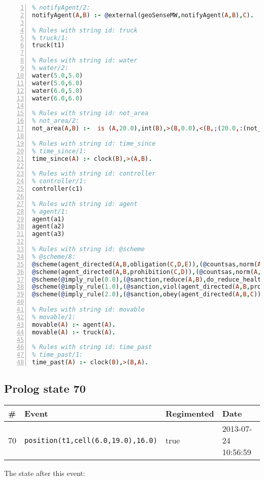 \documentclass[11pt]{article}\usepackage[utf8]{inputenc}\usepackage{geometry}
\begin{document}
\begin{lstlisting}[language=Prolog, numbers=left]
% Rules with string id: notifyAgent
% notifyAgent/2:
notifyAgent(A,B) :- @external(geoSenseMW,notifyAgent(A,B),C).

% Rules with string id: truck
% truck/1:
truck(t1)

% Rules with string id: water
% water/2:
water(5.0,5.0)
water(5.0,6.0)
water(6.0,5.0)
water(6.0,6.0)

% Rules with string id: not_area
% not_area/2:
not_area(A,B) :-  is (A,20.0),int(B),>(B,0.0),<(B,;(20.0,:(not_area(A,B), is (-(B),20.0)))),int(A),>(A,0.0),<(A,;(20.0,:(area(A,B),-(int(A))))),int(B),>(A,0.0),>(B,0.0),<(A,21.0),<(B,21.0).

% Rules with string id: time_since
% time_since/1:
time_since(A) :- clock(B),>(A,B).

% Rules with string id: controller
% controller/1:
controller(c1)

% Rules with string id: agent
% agent/1:
agent(a1)
agent(a2)
agent(a3)

% Rules with string id: @scheme
% @scheme/8:
@scheme(agent_directed(A,B,obligation(C,D,E)),(@countsas,norm(A,B,F,obligation(C,D,E)),F),false,(listTrue(C)),(time_past(D)),false,[plus(viol(agent_directed(A,B,obligation(C,D,E))))|[]],[plus(obey(agent_directed(A,B,obligation(C,D,E))))|[]])
@scheme(agent_directed(A,B,prohibition(C,D)),(@countsas,norm(A,B,E,prohibition(C,D)),E),(listTrue(C)),false,(false),false,[plus(viol(agent_directed(A,B,prohibition(C,D))))|[]],[plus(obey(agent_directed(A,B,prohibition(C,D))))|[]])
@scheme(@imply_rule(0.0),(@sanction,reduce(A,B),do_reduce_health(A,B),notifyAgent(A,changed(status))),true,false,false,false,[min(reduce(A,B))|[]],[])
@scheme(@imply_rule(1.0),(@sanction,viol(agent_directed(A,B,prohibition(C,D))),do_sanction(D)),true,false,false,false,[min(viol(agent_directed(A,B,prohibition(C,D))))|[]],[])
@scheme(@imply_rule(2.0),(@sanction,obey(agent_directed(A,B,C))),true,false,false,false,[min(obey(agent_directed(A,B,C)))|[]],[])

% Rules with string id: movable
% movable/1:
movable(A) :- agent(A).
movable(A) :- truck(A).

% Rules with string id: time_past
% time_past/1:
time_past(A) :- clock(B),>(B,A).

\end{lstlisting}
\clearpage 
\subsection{Prolog state 70}
\begin{table}[ht]
\centering 
\begin{tabular}{l l l l} 
\textbf{\#} & \textbf{Event} & \textbf{Regimented} & \textbf{Date} \\ [0.5ex] 
\hline
70&\texttt{position(t1,cell(6.0,19.0),16.0)}&true&2013-07-24 10:56:59\\ [1ex] \hline\end{tabular}
\end{table}
The state after this event:
\end{document}
